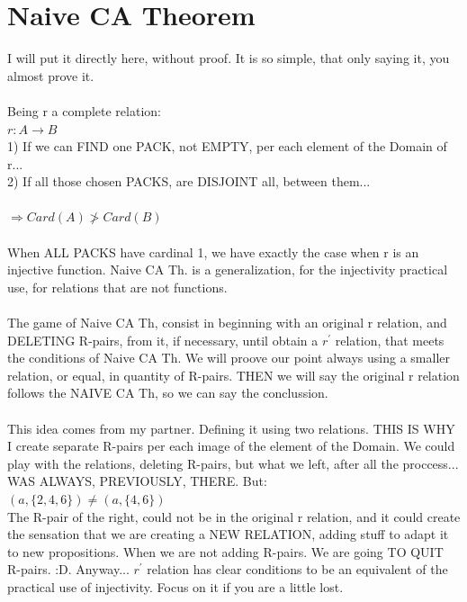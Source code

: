 \chapter{Naive CA Theorem}

	\noindent
	I will put it directly here, without proof. It is so simple, that only saying it, you almost prove it. %
	\\\\
	
	\noindent
	Being r a complete relation:\\
	$r: A \longrightarrow B $\\
	1) If we can FIND one PACK, not EMPTY, per each element of the Domain of r...\\
	2) If all those chosen PACKS, are DISJOINT all, between them...\\\\
	$\Longrightarrow Card( A ) \ngtr Card ( B ) $
	\\\\
	
	\noindent
	When ALL PACKS have cardinal 1, we have exactly the case when r is an injective function. Naive CA Th. is a generalization, for the injectivity practical use, for relations that are not functions.
	\\\\
	
	\noindent
	The game of Naive CA Th, consist in beginning with an original r relation, and DELETING R-pairs, from it, if necessary, until obtain a $r^{\prime}$ relation, that meets the conditions of Naive CA Th. We will proove our point always using a smaller relation, or equal, in quantity of R-pairs. THEN we will say the original r relation follows the NAIVE CA Th, so we can say the conclussion.
	\\\\
	
	\noindent
	This idea comes from my partner. Defining it using two relations. THIS IS WHY I create separate R-pairs per each image of the element of the Domain. We could play with the relations, deleting R-pairs, but what we left, after all the proccess... WAS ALWAYS, PREVIOUSLY, THERE. But:\\
	$ (a, \{2,4,6\}) \neq (a, \{4,6\}) $\\
	The R-pair of the right, could not be in the original r relation, and it could create the sensation that we are creating a NEW RELATION, adding stuff to adapt it to new propositions. When we are not adding R-pairs. We are going TO QUIT R-pairs. :D. Anyway... $r^{\prime}$ relation has clear conditions to be an equivalent of the practical use of injectivity. Focus on it if you are a little lost.
	\\\\
	
